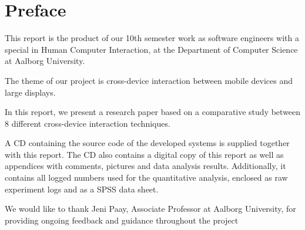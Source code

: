 \section*{Preface}\label{sec:preface}

This report is the product of our 10th semester work as software engineers with a special in Human Computer Interaction, at the Department of Computer Science at Aalborg University.

The theme of our project is cross-device interaction between mobile devices and large displays.

In this report, we present a research paper based on a comparative study between 8 different cross-device interaction techniques.

A CD containing the source code of the developed systems is supplied together with this report.
The CD also contains a digital copy of this report as well as appendices with comments, pictures and data analysis results.
Additionally, it contains all logged numbers used for the quantitative analysis, enclosed as raw experiment logs and as a SPSS data sheet.

We would like to thank Jeni Paay, Associate Professor at Aalborg University, for providing ongoing feedback and guidance throughout the project